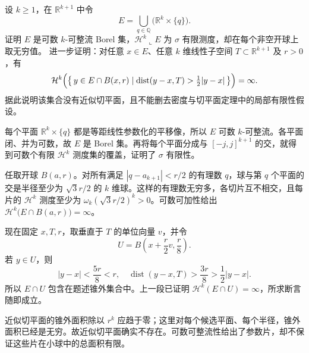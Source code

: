 \begin{exercise}\label{b1:ex:19-dense-parallel-planes}
设 \(k\ge1\)，在 \(\mathbb R^{k+1}\) 中令
\[
 E=\bigcup_{q\in\mathbb Q}\bigl(\mathbb R^k\times\{q\}\bigr).
\]
证明 \(E\) 是可数 \(k\)-可整流 Borel 集，\(\mathcal H^k\llcorner E\) 为 \(\sigma\) 有限测度，却在每个非空开球上取无穷值。
进一步证明：对任意 \(x\in E\)、任意 \(k\) 维线性子空间 \(T\subset\mathbb R^{k+1}\) 及 \(r>0\)，有
\[
 \mathcal H^k\Bigl(
 \bigl\{\,y\in E\cap B(x,r)\mid
 \operatorname{dist}(y-x,T)>\tfrac12|y-x|\,\bigr\}
 \Bigr)=\infty.
\]
据此说明该集合没有近似切平面，且不能删去密度与切平面定理中的局部有限性假设。
\end{exercise}
\begin{solution}
每个平面 \(\mathbb R^k\times\{q\}\) 都是等距线性参数化的平移像，所以 \(E\) 可数 \(k\)-可整流。各平面闭、并为可数，故 \(E\) 是 Borel 集。再将每个平面分成与 \([-j,j]^{k+1}\) 的交，就得到可数个有限 \(\mathcal H^k\) 测度集的覆盖，证明了 \(\sigma\) 有限性。

任取开球 \(B(a,r)\)。对所有满足 \(|q-a_{k+1}|<r/2\) 的有理数 \(q\)，球与第 \(q\) 个平面的交是半径至少为 \(\sqrt3r/2\) 的 \(k\) 维球。这样的有理数无穷多，各切片互不相交，且每片的 \(\mathcal H^k\) 测度至少为 \(\omega_k(\sqrt3r/2)^k>0\)。可数可加性给出 \(\mathcal H^k\bigl(E\cap B(a,r)\bigr)=\infty\)。

现在固定 \(x,T,r\)，取垂直于 \(T\) 的单位向量 \(v\)，并令
\[
 U=B\left(x+\frac r2v,\frac r8\right).
\]
若 \(y\in U\)，则
\[
 |y-x|<\frac{5r}{8}<r,
 \quad \operatorname{dist}(y-x,T)>\frac{3r}{8}
 >\frac12|y-x|.
\]
所以 \(E\cap U\) 包含在题述锥外集合中。上一段已证明 \(\mathcal H^k(E\cap U)=\infty\)，所求断言随即成立。

近似切平面的锥外面积除以 \(r^k\) 应趋于零；这里对每个候选平面、每个半径，锥外面积已经是无穷。故近似切平面确实不存在。可数可整流性给出了参数片，却不保证这些片在小球中的总面积有限。
\end{solution}

